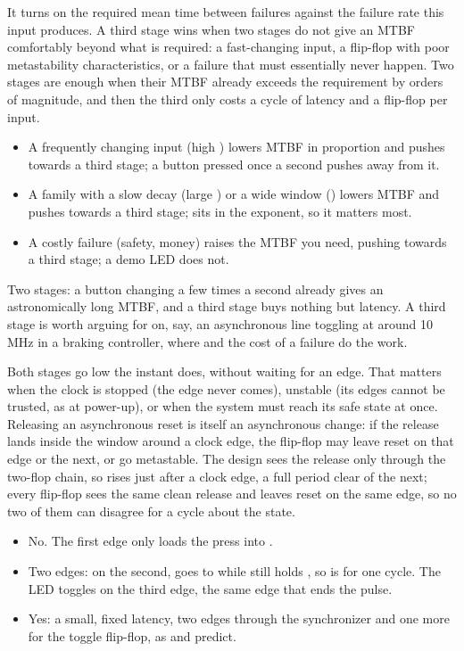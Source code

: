 It turns on the required mean time between failures against the failure rate this input
produces. A third stage wins when two stages do not give an MTBF comfortably beyond what is
required: a fast-changing input, a flip-flop with poor metastability characteristics, or a failure
that must essentially never happen. Two stages are enough when their MTBF already exceeds the
requirement by orders of magnitude, and then the third only costs a cycle of latency and a
flip-flop per input.
\begin{itemize}
  \item A frequently changing input (high ) lowers MTBF in proportion and pushes
    towards a third stage; a button pressed once a second pushes away from it.
  \item A family with a slow decay (large ) or a wide window () lowers MTBF and
    pushes towards a third stage;  sits in the exponent, so it matters most.
  \item A costly failure (safety, money) raises the MTBF you need, pushing towards a third stage; a
    demo LED does not.
\end{itemize}
Two stages: a button changing a few times a second already gives an astronomically long MTBF,
and a third stage buys nothing but latency. A third stage is worth arguing for on, say, an
asynchronous line toggling at around 10\,MHz in a braking controller, where  and the
cost of a failure do the work.

Both stages go low the instant  does, without waiting for an edge.
That matters when the clock is stopped (the edge never comes), unstable (its edges cannot be
trusted, as at power-up), or when the system must reach its safe state at once.
Releasing an asynchronous reset is itself an asynchronous change: if
the release lands inside the window around a clock edge, the flip-flop may leave reset on that edge
or the next, or go metastable.
The design sees the release only through the two-flop chain, so
 rises just after a clock edge, a full period clear of the next; every flip-flop
sees the same clean release and leaves reset on the same edge, so no two of them can disagree for a
cycle about the state.

\begin{itemize}
  \item No. The first edge only loads the press into .
  \item Two edges: on the second,  goes to  while  still
    holds , so  is  for one cycle. The LED toggles on the third
    edge, the same edge that ends the pulse.
  \item Yes: a small, fixed latency, two edges through the synchronizer and one more for the toggle
    flip-flop, as  and  predict.
\end{itemize}

